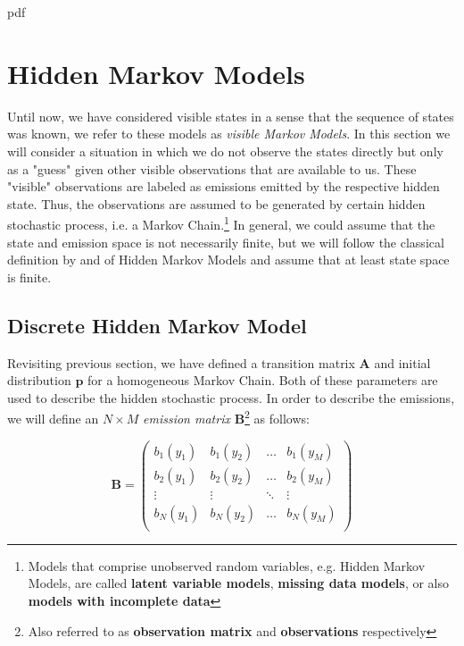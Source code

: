 

\if pdf
    \graphicspath{{Chapter4/Figs/Raster/}{Chapter4/Figs/PDF/}{Chapter4/Figs/}}
\else
    \graphicspath{{Chapter4/Figs/Vector/}{Chapter4/Figs/}}
\fi

\chapter{Hidden Markov Models}

Until now, we have considered visible states in a sense that the sequence of states was known, we refer to these models as \textit{visible Markov Models}.
In this section we will consider a situation in which we do not observe the states directly but only as a "guess" given other visible observations that are available to us. 
These "visible" observations are labeled as emissions emitted by the respective hidden state. Thus, the observations are assumed to be generated by certain hidden stochastic process, i.e. a Markov Chain.\footnote{Models that
comprise unobserved random variables, e.g. Hidden Markov Models, are called \textbf{latent variable models}, \textbf{missing data models}, or also \textbf{models with incomplete data}}
In general, we could assume that the state and emission space is not necessarily finite, but we will follow the classical definition by \cite{Rabiner1989} and \cite{Elliott1995} of Hidden Markov Models and assume that at least state space is finite.

\section{Discrete Hidden Markov Model}

Revisiting previous section, we have defined a transition matrix $\textbf{A}$ and initial distribution $\textbf{p}$ for a homogeneous Markov Chain. Both of these parameters are used to describe the hidden stochastic process.
In order to describe the emissions, we will define an $N \times M$ \textit{emission matrix} $\textbf{B}$\footnote{Also referred to as \textbf{observation matrix} and \textbf{observations} respectively} as follows:

\begin{equation}
    \textbf{B} = \begin{pmatrix}
    b_1(y_1) & b_1(y_2) & \ldots & b_1(y_M) \\
    b_2(y_1) & b_2(y_2) & \ldots & b_2(y_M) \\
    \vdots & \vdots & \ddots & \vdots \\
    b_N(y_1) & b_N(y_2) & \ldots & b_N(y_M) \\
    \end{pmatrix}
\end{equation}

